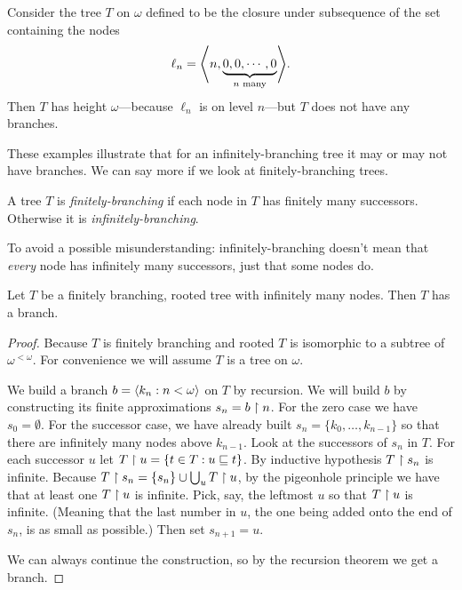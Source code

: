 \documentclass[10pt]{amsart}
\begin{document}
\begin{example}\label{ex:no-branch}
Consider the tree $T$ on $\omega$ defined to be the closure under subsequence of the set containing the nodes
\[
\ell_n = {\left\langle n,\underbrace{0,0,\cdots,0}_{n \text{ many}} \right\rangle}.
\]
Then $T$ has height $\omega$---because $\ell_n$ is on level $n$---but $T$ does not have any branches.
\end{example}

These examples illustrate that for an infinitely-branching tree it may or may not have branches. We can say more if we look at finitely-branching trees.

\begin{definition}
A tree $T$ is \emph{finitely-branching} if each node in $T$ has finitely many successors. Otherwise it is \emph{infinitely-branching}.
\end{definition}

To avoid a possible misunderstanding: infinitely-branching doesn't mean that \emph{every} node has infinitely many successors, just that some nodes do.

\begin{theorem}
Let $T$ be a finitely branching, rooted tree with infinitely many nodes. Then $T$ has a branch. 
\end{theorem}

\begin{proof}
Because $T$ is finitely branching and rooted $T$ is isomorphic to a subtree of $\omega^{<\omega}$. For convenience we will assume $T$ is a tree on $\omega$.

We build a branch $b = {\left\langle  k_n : n < \omega \right\rangle}$ on $T$ by recursion. We will build $b$ by constructing its finite approximations $s_n = b \upharpoonright n$. For the zero case we have $s_0 = \emptyset$. For the successor case, we have already built $s_n = \{ k_0, \ldots, k_{n-1}\}$ so that there are infinitely many nodes above $k_{n-1}$. Look at the successors of $s_n$ in $T$. For each successor $u$ let $T \upharpoonright u = \{ t \in T : u \sqsubseteq t \}$. By inductive hypothesis $T \upharpoonright s_n$ is infinite. Because $T \upharpoonright s_n = \{ s_n \} \cup \bigcup_u T \upharpoonright u$, by the pigeonhole principle we have that at least one $T \upharpoonright u$ is infinite. Pick, say, the leftmost $u$ so that $T \upharpoonright u$ is infinite. (Meaning that the last number in $u$, the one being added onto the end of $s_n$, is as small as possible.) Then set $s_{n+1} = u$.

We can always continue the construction, so by the recursion theorem we get a branch.
\end{proof}
\end{document}
